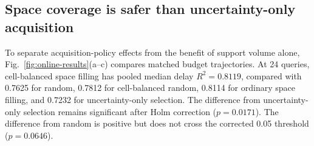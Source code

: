 \documentclass[preprint,12pt]{elsarticle}
\begin{document}
\begin{table}[t]
\centering
\caption{Cell-balanced space-filling results by held-out corner. Values are medians over five candidate-pool seeds.}
\label{tab:corner-results}
\end{table}

\subsection{Space coverage is safer than uncertainty-only acquisition}

To separate acquisition-policy effects from the benefit of support volume alone, Fig.~\ref{fig:online-results}(a--c) compares matched budget trajectories. At 24 queries, cell-balanced space filling has pooled median delay $R^2=0.8119$, compared with 0.7625 for random, 0.7812 for cell-balanced random, 0.8114 for ordinary space filling, and 0.7232 for uncertainty-only selection. The difference from uncertainty-only selection remains significant after Holm correction ($p=0.0171$). The difference from random is positive but does not cross the corrected 0.05 threshold ($p=0.0646$).
\end{document}
